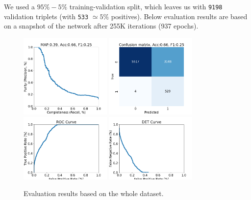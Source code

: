 \documentclass[DM,authoryear,toc]{lsstdoc}
\begin{document}
We used a $95\%-5\%$ training-validation split, which leaves us with \texttt{9198} validation triplets (with \texttt{533} $\simeq 5\%$ positives). Below evaluation results are based on a snapshot of the network after 255K iterations (937 epochs).


\begin{figure}[h]
  \centering
  \includegraphics[width=0.4\textwidth]{precrec_13-resnet50-FullAugmentation-scratch-B64__0255000__npy_data_0.1.2-0sigma_256by256__posw_1.png}
  \includegraphics[width=0.4\textwidth]{confmat_13-resnet50-FullAugmentation-scratch-B64__0255000__npy_data_0.1.2-0sigma_256by256__posw_1.png}
  \includegraphics[width=0.4\textwidth]{roc_13-resnet50-FullAugmentation-scratch-B64__0255000__npy_data_0.1.2-0sigma_256by256__posw_1.png}
  \includegraphics[width=0.4\textwidth]{det_13-resnet50-FullAugmentation-scratch-B64__0255000__npy_data_0.1.2-0sigma_256by256__posw_1.png}
  \caption{Evaluation results based on the whole dataset.}
  \label{fig:tract_templates}
\end{figure}
\end{document}
